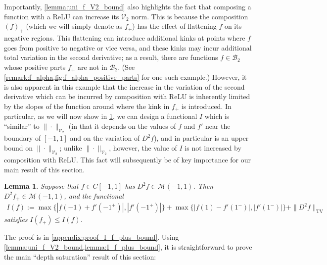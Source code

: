 \documentclass{article}
\DeclareMathOperator{\TV}{TV}
\def\cB{{\mathcal{B}}}
\def\cM{{\mathcal{M}}}
\def\cV{{\mathcal{V}}}
\newtheorem{lemma}[theorem]{Lemma}
\begin{document}
Importantly, \cref{lemma:uni_f_V2_bound} also highlights the fact that composing a function with a ReLU can increase its $\cV_2$ norm. This is because the composition $(f)_+$ (which we will simply denote as $f_+$) has the effect of flattening $f$ on its negative regions. This flattening can introduce additional kinks at points where $f$ goes from positive to negative or vice versa, and these kinks may incur additional total variation in the second derivative; as a result, there are functions $f \in \cB_2$ whose positive parts $f_+$ are not in $\cB_2$. (See \cref{remark:f_alpha,fig:f_alpha_positive_parts} for one such example.) However, it is also apparent in this example that the increase in the variation of the second derivative which can be incurred by composition with ReLU is inherently limited by the slopes of the function around where the kink in $f_+$ is introduced. In particular, as we will now show in \cref{lemma:I_f_plus_bound}, we can design a functional $I$ which is ``similar'' to $\| \cdot \|_{\cV_2}$ (in that it depends on the values of $f$ and $f'$ near the boundary of $[-1,1]$ and on the variation of $D^2 f$), and in particular is an upper bound on $\| \cdot \|_{\cV_2}$; unlike $\| \cdot \|_{\cV_2}$, however, the value of $I$ is not increased by composition with ReLU. This fact will subsequently be of key importance for our main result of this section.
\begin{lemma} \label{lemma:I_f_plus_bound}
    Suppose that $f \in C[-1,1]$ has $D^2 f \in \cM(-1,1)$. Then $D^2 f_+ \in \cM(-1,1)$, and the functional
    \begin{align}
        I(f) := \max\{ |f(-1)+f'(-1^{+})|, |f'(-1^{+})| \} + \max\{|f(1)-f'(1^{-})|, |f'(1^{-})|\} + \| D^2 f \|_{\TV}
    \end{align}
    satisfies $I(f_+) \leq I(f)$.
\end{lemma}
The proof is in \cref{appendix:proof_I_f_plus_bound}. Using \cref{lemma:uni_f_V2_bound,lemma:I_f_plus_bound}, it is straightforward to prove the main ``depth saturation'' result of this section:
\end{document}
